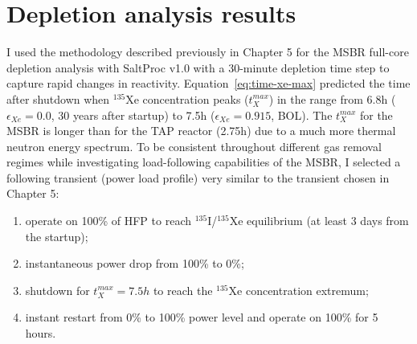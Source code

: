 \section{Depletion analysis results}
I used the methodology described previously in Chapter 5 for the \gls{MSBR} 
full-core depletion analysis with SaltProc v1.0 with a 30-minute depletion 
time step to capture rapid changes in reactivity. 
Equation~\ref{eq:time-xe-max} predicted the time after shutdown when 
$^{135}$Xe concentration peaks ($t^{max}_X$) in the range from 6.8h 
($\epsilon_{Xe}=0.0$, 30 years after startup) to 7.5h ($\epsilon_{Xe}=0.915$, 
\gls{BOL}). The $t^{max}_X$ for the \gls{MSBR} is longer than 
for the \gls{TAP} reactor (2.75h) due to a much more thermal neutron energy 
spectrum. To be consistent throughout different gas removal regimes while 
investigating load-following capabilities of the \gls{MSBR}, I selected a
following transient (power load profile) very similar to the transient chosen 
in Chapter 5:
\begin{enumerate}[label=(\alph*), noitemsep, topsep=0pt]
	\item operate on 100\% of \gls{HFP} to reach $^{135}$I/$^{135}$Xe 
	equilibrium (at 
	least 3 days from the startup);
	\item instantaneous power drop from 100\% to 0\%;
	\item shutdown for $t^{max}_X=7.5h$ to reach the $^{135}$Xe concentration 
	extremum;
	\item instant restart from 0\% to 100\% power level and operate on 100\% 
	for 5 hours.
\end{enumerate}



